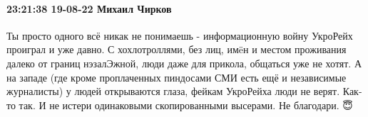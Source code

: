  
 
 
 
 

\paragraph{23:21:38 19-08-22 Михаил Чирков}

Ты просто одного всё никак не понимаешь - информационную войну УкроРейх проиграл и уже давно.
С хохлотроллями, без лиц, имëн и местом проживания далеко от границ нэзалЭжной, люди даже для прикола, общаться уже не хотят.
А на западе (где кроме проплаченных пиндосами СМИ есть ещё и независимые журналисты) у людей открываются глаза, фейкам УкроРейха люди не верят.
Как-то так.
И не истери одинаковыми скопированными высерами.
Не благодари. 😇
